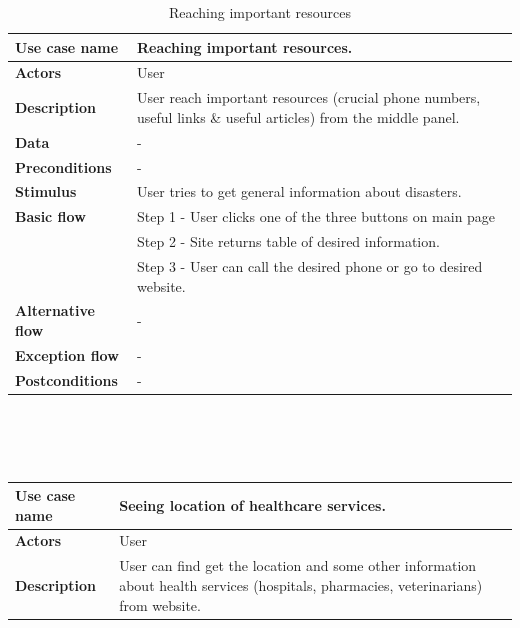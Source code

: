 \begin{center}
    \begin{table}[H]
        \begin{tabular}{| m{3cm}| m{10cm} |}
            \hline
            \textbf{Use case name} & Reaching important resources. \\
            \hline
            \textbf{Actors} & User\\
            \hline
            \textbf{Description} & User reach important resources (crucial phone numbers, useful links \& useful articles) from the middle panel.\\
            \hline
            \textbf{Data} & -\\
            \hline
            \textbf{Preconditions} & - \\
            \hline
            \textbf{Stimulus} & User tries to get general information about disasters. \\
            \hline
            \textbf{Basic flow} & Step 1 - User clicks one of the three buttons on main page\\
                                & Step 2 - Site returns table of desired information.\\
                                & Step 3 - User can call the desired phone or go to desired website.\\
            \hline
            \textbf{Alternative flow} & - \\
            \hline
            \textbf{Exception flow} &  -\\
            \hline
            \textbf{Postconditions} & -\\
            \hline
        \end{tabular}
        \caption[Reaching important resources]{Reaching important resources}
    \end{table}
    ~\\~\\~\\
    \begin{table}[H]
        \begin{tabular}{| m{3cm}| m{10cm} |}
            \hline
            \textbf{Use case name} & Seeing location of healthcare services.  \\
            \hline
            \textbf{Actors} & User\\
            \hline
            \textbf{Description} & User can find get the location and some other information about health services (hospitals, pharmacies, veterinarians) from website.\\

\end{tabular}
\end{table}
\end{center}
